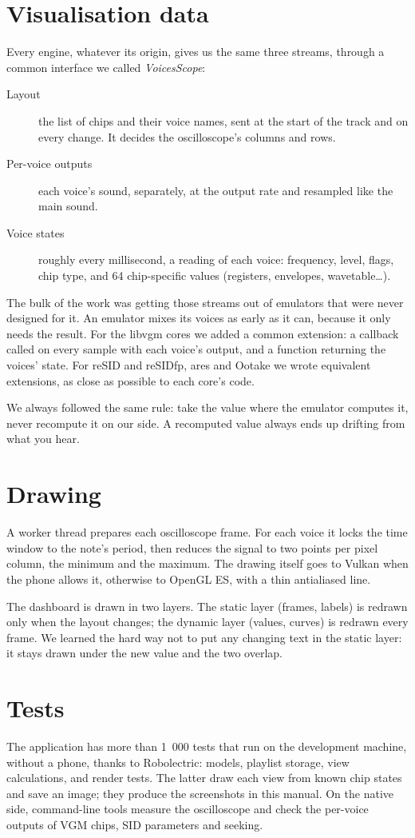 \section{Visualisation data}
Every engine, whatever its origin, gives us the same three streams, through a common interface we called
\emph{VoicesScope}:
\begin{description}
  \item[Layout] the list of chips and their voice names, sent at the start of the track and on every change. It
        decides the oscilloscope's columns and rows.
  \item[Per-voice outputs] each voice's sound, separately, at the output rate and resampled like the main sound.
  \item[Voice states] roughly every millisecond, a reading of each voice: frequency, level, flags, chip type, and 64
        chip-specific values (registers, envelopes, wavetable\dots).
\end{description}
The bulk of the work was getting those streams out of emulators that were never designed for it. An emulator mixes
its voices as early as it can, because it only needs the result. For the libvgm cores we added a common extension: a
callback called on every sample with each voice's output, and a function returning the voices' state. For reSID and
reSIDfp, ares and Ootake we wrote equivalent extensions, as close as possible to each core's code.

We always followed the same rule: take the value where the emulator computes it, never recompute it on our side. A
recomputed value always ends up drifting from what you hear.

\section{Drawing}
A worker thread prepares each oscilloscope frame. For each voice it locks the time window to the note's period, then
reduces the signal to two points per pixel column, the minimum and the maximum. The drawing itself goes to Vulkan
when the phone allows it, otherwise to OpenGL ES, with a thin antialiased line.

The dashboard is drawn in two layers. The static layer (frames, labels) is redrawn only when the layout changes; the
dynamic layer (values, curves) is redrawn every frame. We learned the hard way not to put any changing text in the
static layer: it stays drawn under the new value and the two overlap.

\section{Tests}
The application has more than 1~000 tests that run on the development machine, without a phone, thanks to
Robolectric: models, playlist storage, view calculations, and render tests. The latter draw each view from known chip
states and save an image; they produce the screenshots in this manual. On the native side, command-line tools measure
the oscilloscope and check the per-voice outputs of VGM chips, SID parameters and seeking.

